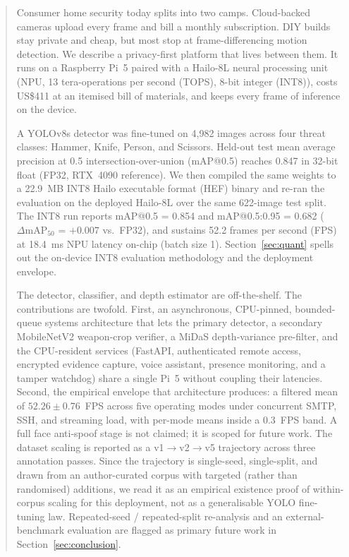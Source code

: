 \documentclass{ieeeaccess}
\begin{document}
\begin{abstract}
Consumer home security today splits into two camps. Cloud-backed cameras upload every frame and bill a monthly subscription. DIY builds stay private and cheap, but most stop at frame-differencing motion detection. We describe a privacy-first platform that lives between them. It runs on a Raspberry Pi~5 paired with a Hailo-8L neural processing unit (NPU, 13 tera-operations per second (TOPS), 8-bit integer (INT8)), costs US\$411 at an itemised bill of materials, and keeps every frame of inference on the device.

A YOLOv8s detector was fine-tuned on 4{,}982 images across four threat classes: Hammer, Knife, Person, and Scissors. Held-out test mean average precision at 0.5 intersection-over-union (mAP{@}0.5) reaches 0.847 in 32-bit float (FP32, RTX~4090 reference). We then compiled the same weights to a 22.9~MB INT8 Hailo executable format (HEF) binary and re-ran the evaluation on the deployed Hailo-8L over the same 622-image test split. The INT8 run reports mAP{@}0.5 = 0.854 and mAP{@}0.5:0.95 = 0.682 ($\Delta\text{mAP}_{50}$ = $+0.007$ vs.\ FP32), and sustains 52.2 frames per second (FPS) at 18.4~ms NPU latency on-chip (batch size 1). Section~\ref{sec:quant} spells out the on-device INT8 evaluation methodology and the deployment envelope.

The detector, classifier, and depth estimator are off-the-shelf. The contributions are twofold. First, an asynchronous, CPU-pinned, bounded-queue systems architecture that lets the primary detector, a secondary MobileNetV2 weapon-crop verifier, a MiDaS depth-variance pre-filter, and the CPU-resident services (FastAPI, authenticated remote access, encrypted evidence capture, voice assistant, presence monitoring, and a tamper watchdog) share a single Pi~5 without coupling their latencies. Second, the empirical envelope that architecture produces: a filtered mean of $52.26 \pm 0.76$~FPS across five operating modes under concurrent SMTP, SSH, and streaming load, with per-mode means inside a 0.3~FPS band. A full face anti-spoof stage is not claimed; it is scoped for future work. The dataset scaling is reported as a v1$\rightarrow$v2$\rightarrow$v5 trajectory across three annotation passes. Since the trajectory is single-seed, single-split, and drawn from an author-curated corpus with targeted (rather than randomised) additions, we read it as an empirical existence proof of within-corpus scaling for this deployment, not as a generalisable YOLO fine-tuning law. Repeated-seed / repeated-split re-analysis and an external-benchmark evaluation are flagged as primary future work in Section~\ref{sec:conclusion}.
\end{abstract}
\end{document}
